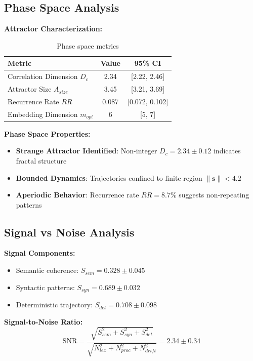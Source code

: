 \documentclass[11pt,a4paper]{article}
\begin{document}
\subsection{Phase Space Analysis}

\textbf{Attractor Characterization:}

\begin{table}[ht]
\centering
\caption{Phase space metrics}
\begin{tabular}{@{}lcc@{}}
\toprule
Metric & Value & 95\% CI \\
\midrule
Correlation Dimension $D_c$ & 2.34 & [2.22, 2.46] \\
Attractor Size $A_{size}$ & 3.45 & [3.21, 3.69] \\
Recurrence Rate $RR$ & 0.087 & [0.072, 0.102] \\
Embedding Dimension $m_{opt}$ & 6 & [5, 7] \\
\bottomrule
\end{tabular}
\end{table}

\textbf{Phase Space Properties:}
\begin{itemize}
    \item \textbf{Strange Attractor Identified}: Non-integer $D_c = 2.34 \pm 0.12$ indicates fractal structure
    \item \textbf{Bounded Dynamics}: Trajectories confined to finite region $\|\mathbf{s}\| < 4.2$
    \item \textbf{Aperiodic Behavior}: Recurrence rate $RR = 8.7\%$ suggests non-repeating patterns
\end{itemize}

\subsection{Signal vs Noise Analysis}

\textbf{Signal Components:}
\begin{itemize}
    \item Semantic coherence: $S_{sem} = 0.328 \pm 0.045$
    \item Syntactic patterns: $S_{syn} = 0.689 \pm 0.032$
    \item Deterministic trajectory: $S_{det} = 0.708 \pm 0.098$
\end{itemize}

\textbf{Signal-to-Noise Ratio:}
\begin{equation}
\text{SNR} = \frac{\sqrt{S_{sem}^2 + S_{syn}^2 + S_{det}^2}}{\sqrt{N_{lex}^2 + N_{proc}^2 + N_{drift}^2}} = 2.34 \pm 0.34
\end{equation}
\end{document}
